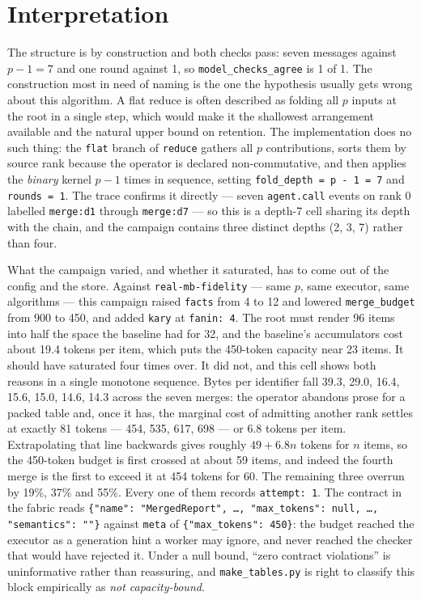 \documentclass[11pt]{article}
\begin{document}
\section{Interpretation}

The structure is by construction and both checks pass: seven messages against $p-1=7$ and
one round against 1, so \texttt{model\_checks\_agree} is 1 of 1. The construction most in
need of naming is the one the hypothesis usually gets wrong about this algorithm. A flat
reduce is often described as folding all $p$ inputs at the root in a single step, which
would make it the shallowest arrangement available and the natural upper bound on
retention. The implementation does no such thing: the \texttt{flat} branch of
\texttt{reduce} gathers all $p$ contributions, sorts them by source rank because the
operator is declared non-commutative, and then applies the \emph{binary} kernel $p-1$ times
in sequence, setting \texttt{fold\_depth = p - 1 = 7} and \texttt{rounds = 1}. The trace
confirms it directly --- seven \texttt{agent.call} events on rank 0 labelled
\texttt{merge:d1} through \texttt{merge:d7} --- so this is a depth-7 cell sharing its depth
with the chain, and the campaign contains three distinct depths (2, 3, 7) rather than four.

What the campaign varied, and whether it saturated, has to come out of the config and the
store. Against \texttt{real-mb-fidelity} --- same $p$, same executor, same algorithms ---
this campaign raised \texttt{facts} from 4 to 12 and lowered \texttt{merge\_budget} from 900
to 450, and added \texttt{kary} at \texttt{fanin: 4}. The root must render 96 items into
half the space the baseline had for 32, and the baseline's accumulators cost about 19.4
tokens per item, which puts the 450-token capacity near 23 items. It should have saturated
four times over. It did not, and this cell shows both reasons in a single monotone
sequence. Bytes per identifier fall 39.3, 29.0, 16.4, 15.6, 15.0, 14.6, 14.3 across the
seven merges: the operator abandons prose for a packed table and, once it has, the marginal
cost of admitting another rank settles at exactly 81 tokens --- 454, 535, 617, 698 --- or
6.8 tokens per item. Extrapolating that line backwards gives roughly $49 + 6.8n$ tokens for
$n$ items, so the 450-token budget is first crossed at about 59 items, and indeed the
fourth merge is the first to exceed it at 454 tokens for 60. The remaining three overrun by
19\%, 37\% and 55\%. Every one of them records \texttt{attempt: 1}. The contract in the
fabric reads \texttt{\{"name": "MergedReport", \dots, "max\_tokens": null, \dots,
"semantics": ""\}} against \texttt{meta} of \texttt{\{"max\_tokens": 450\}}: the budget
reached the executor as a generation hint a worker may ignore, and never reached the
checker that would have rejected it. Under a null bound, ``zero contract violations'' is
uninformative rather than reassuring, and \texttt{make\_tables.py} is right to classify
this block empirically as \emph{not capacity-bound}.
\end{document}
